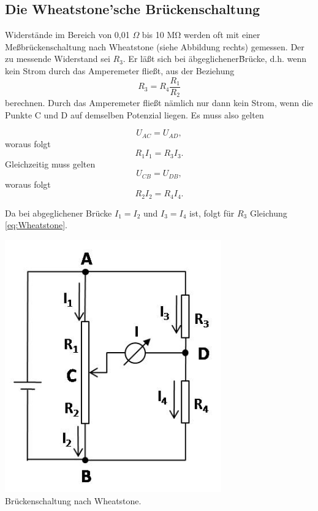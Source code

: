 \subsection{Die Wheatstone'sche Brückenschaltung}

Widerstände im Bereich von 0,01 $\Omega$ bis 10 M$\mathrm{\Omega}$ werden oft mit einer Meßbrückenschaltung nach Wheatstone (siehe Abbildung rechts) gemessen. Der zu messende Widerstand sei $R_3$. Er läßt sich bei \"abgeglichener\" Brücke, d.h. wenn kein Strom durch das Amperemeter fließt, aus der Beziehung
\begin{equation}
 R_3 = R_4\frac{R_1}{R_2}
 \label{eq:Wheatstone}
\end{equation}
berechnen. Durch das Amperemeter fließt nämlich nur dann kein Strom, wenn die Punkte C und D auf demselben Potenzial liegen. Es muss also gelten

\begin{minipage}[b]{0.5\textwidth}
\begin{equation}
 U_{AC} = U_{AD},
\end{equation}
woraus folgt
\begin{equation}
 R_1 I_1 = R_3 I_3.
\end{equation}
Gleichzeitig muss gelten
\begin{equation}
 U_{CB} = U_{DB},
\end{equation}
woraus folgt
\begin{equation}
 R_2 I_2 = R_4 I_4.
\end{equation}

Da bei abgeglichener Brücke $I_1 = I_2$ und $I_3 = I_4$ ist, folgt für $R_3$ Gleichung \ref{eq:Wheatstone}.
\end{minipage}
%
\begin{minipage}[b]{0.5\textwidth}
 \centering
 \includegraphics[width=0.7\textwidth]{Versuch_13-14/Abbildungen/Wheatstone_Prinzip.jpg}\\
 Brückenschaltung nach Wheatstone.
\end{minipage}


